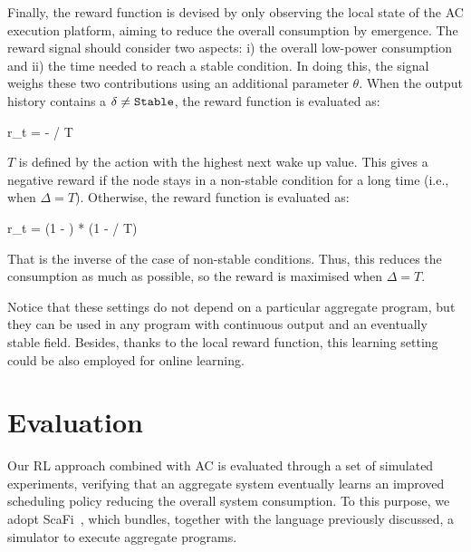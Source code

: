 Finally, the reward function is devised by only observing the local state of the \ac{AC} execution platform, aiming to reduce the overall consumption by emergence.
%
The reward signal should consider two aspects: i) the overall low-power consumption and ii) the time needed to reach a stable condition.  
In doing this, the signal weighs these two contributions using an additional parameter $\theta$.
 When the output history contains a $\delta \neq \text{\texttt{Stable}}$, the reward function is evaluated as:
\begin{iequation}
r_t = - \theta * \Delta / T
\end{iequation}
$T$ is defined by the action with the highest next wake up value.
%
This gives a negative reward if the node stays in a non-stable condition for a long time (i.e., when $\Delta = T$).
Otherwise, the reward function is evaluated as:
\begin{iequation}
r_t = (1 - \theta) * (1 - \Delta / T)
\end{iequation}
That is the inverse of the case of non-stable conditions. 
 Thus, this reduces the consumption as much as possible, so the reward is maximised when $\Delta = T$. 

Notice that these settings do not depend on a particular aggregate program, 
 but they can be used in any program with continuous output and an eventually stable field. 
%
Besides, thanks to the local reward function, this learning setting could be also employed for online learning.

\newcommand{\rlsol}{{\sc{}Rl}}
\newcommand{\periodicsol}{{\sc{}Periodic}}
\newcommand{\adhocsol}{{\sc{}Ad-hoc}}
\newcommand{\swapscen}{{\sc{}Swap}}
\newcommand{\multiswap}{{\sc{}MultiSwap}}
\section{Evaluation}\label{sec:evaluation}


Our \ac{RL} approach combined with \ac{AC} is evaluated through a set of simulated experiments, 
 verifying that an aggregate system eventually learns an improved scheduling policy reducing the overall system consumption.
%
To this purpose, we adopt ScaFi~\cite{DBLP:conf/isola/CasadeiVAD20}, 
 which bundles, together with the language previously discussed, a simulator to execute aggregate programs.
 
